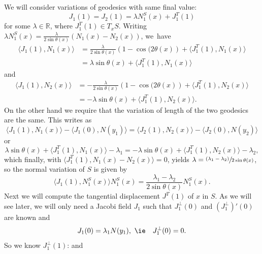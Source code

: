 \documentclass[10pt]{amsart}
\newcommand{\psfrac}[2]{\sfrac{(#1)}{#2}}
\theoremstyle{plain}
\theoremstyle{definition}
\newcommand{\RR}{{\mathbb R}}
\let\di\displaystyle
\let\f\frac
\let\l\lambda
\begin{document}
We will consider variations of geodesics with same final value:
\begin{equation}
J_1(1)=J_2(1)=\l N_1^S(x)+ J_1^T(1)
\end{equation}
for some $\l\in \RR$, where $J_1^T(1)\in T_xS$. Writing $\l N_1^S(x)=\f{\l}{2\sin\theta(x)} (N_1(x)-N_2(x))$, we~have
\begin{equation}
\begin{split}
\langle J_1(1), N_1(x)\rangle &= \f{\l}{2\sin\theta(x)}\left(1-\cos(2\theta(x)\right)+ \langle J_1^T(1), N_1(x)\rangle\\&=\l\sin\theta(x)+ \langle J_1^T(1), N_1(x)\rangle
\end{split}
\end{equation}
and
\begin{equation}
\begin{split}
\langle J_1(1), N_2(x)\rangle &= -\f{\l}{2\sin\theta(x)}\left(1-\cos(2\theta(x)\right)+ \langle J_1^T(1), N_{{2}}(x)\rangle\\&=-\l\sin\theta(x)+ \langle J_1^T(1), N_2(x)\rangle.
\end{split}
\end{equation}
On the other hand we require that the variation of length of the two geodesics are the same. This writes as
\begin{equation}
\langle J_1(1), N_1(x)\rangle -\langle J_1(0), N(y_1)\rangle=\langle J_2(1), N_2(x)\rangle -\langle J_2(0), N(y_2)\rangle
\end{equation}
or
\begin{equation}
\l\sin\theta(x)+ \langle J_1^T(1), N_1(x)\rangle-\l_1=-\l\sin\theta(x)+\langle J_1^T(1), N_2(x)\rangle-\l_2,
\end{equation}
which finally, with $\langle J_1^T(1), N_1(x)-N_2(x)\rangle=0$, yields $\di \l=\psfrac{\l_1-\l_2}{2\sin\theta(x)}$, so the normal variation of $S$ is given by
\begin{equation}
\label{3.18}
\langle J_1(1), N_1^S(x)\rangle N_1^S(x)=\f{\l_1-\l_2}{2\sin\theta(x)}N_1^S(x).
\end{equation}
Next we will compute the tangential displacement $J^T(1)$ of $x$ in $S$. As we will see later, we will only need a Jacobi field $J_1$ such that $J_1^\perp(0)$
and $(J_1^\perp)'(0)$ are known and
\begin{equation}
J_1(0)=\l_1N(y_1), \ \hbox{{\ie}}\quad J_1^\perp(0)=0.
\end{equation}
So we know $J_1^\perp(1)$: and
\end{document}
